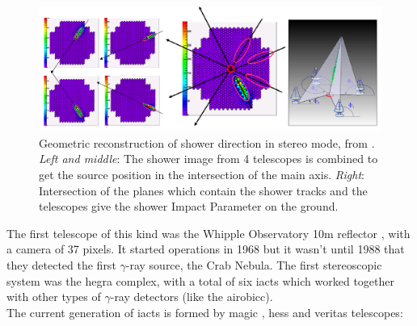 \documentclass[main.tex]{subfiles}
\begin{document}
\begin{figure}[h]
    \centering
    \includegraphics[width=1\textwidth]{Pictures/stereomode.pdf}
    \caption{Geometric reconstruction of shower direction in stereo mode, from \cite{2015groundbasedtechniques}. \textit{Left and middle}: The shower image from 4 telescopes is combined to get the source position in the intersection of the main axis. \textit{Right}: Intersection of the planes which contain the shower tracks and the telescopes give the shower Impact Parameter on the ground.}
    \label{fig:stereoreco}
\end{figure}

The first telescope of this kind was the Whipple Observatory 10m reflector \cite{whipple}, with a camera of 37 pixels. It started operations in 1968 but it wasn't until 1988 that they detected the first $\gamma$-ray source, the Crab Nebula. The first stereoscopic system was the \gls{hegra} complex, with a total of six \glspl{iact} which worked together with other types of $\gamma$-ray detectors (like the \gls{airobicc}).\\
The current generation of \glspl{iact} is formed by \gls{magic} \cite{2011magic}, \gls{hess} \cite{2018HESS} and \gls{veritas} \cite{2019VERITAS} telescopes:\\
\end{document}
